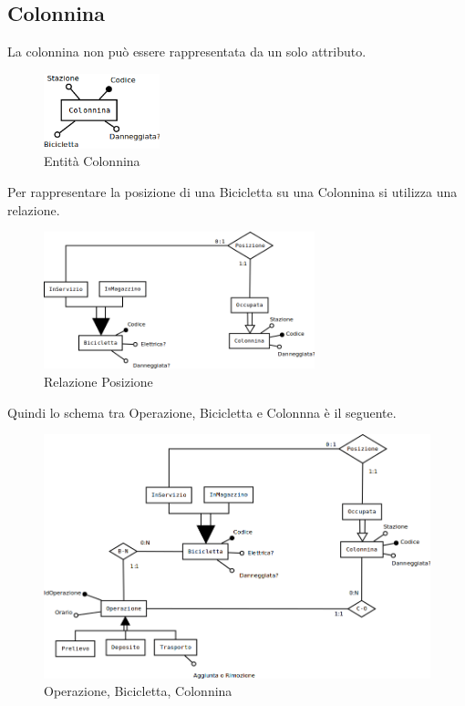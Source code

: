 \documentclass[a4paper,twoside]{article}
\begin{document}
\subsection{Colonnina}
La colonnina non può essere rappresentata da un solo attributo.
\begin{figure}[H]
 \centering
  \includegraphics[width=0.3\textwidth]{Concettuale08}
\caption{Entità Colonnina}
\end{figure}
Per rappresentare la posizione di una Bicicletta su una Colonnina si utilizza una relazione.
\begin{figure}[H]
 \centering
  \includegraphics[width=0.7\textwidth]{Concettuale09}
\caption{Relazione Posizione}
\end{figure}
Quindi lo schema tra Operazione, Bicicletta e Colonnna è il seguente.
\begin{figure}[H]
 \centering
  \includegraphics[width=1\textwidth]{Concettuale10}
\caption{Operazione, Bicicletta, Colonnina}
\end{figure}
\end{document}
